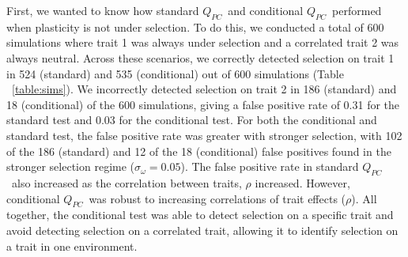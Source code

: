 \documentclass[11pt,letterpaper]{article}
\newcommand{\qpc}{$Q_{PC}$}
\begin{document}

First, we wanted to know how standard \qpc\ and conditional \qpc\ performed when plasticity is not under selection. 
To do this, we conducted a total of 600 simulations where trait 1 was always under selection and a correlated trait 2 was always neutral. 
Across these scenarios, we correctly detected selection on trait 1 in 524 (standard) and 535 (conditional) out of 600 simulations (Table ~\ref{table:sims}). 
We incorrectly detected selection on trait 2 in 186 (standard) and 18 (conditional) of the 600 simulations, giving a false positive rate of 0.31 for the standard test and 0.03 for the conditional test. 
For both the conditional and standard test, the false positive rate was greater with stronger selection, with 102 of the 186 (standard) and 12 of the 18 (conditional) false positives found in the stronger selection regime ($\sigma_\omega = 0.05$). 
The false positive rate in standard \qpc\ also increased as the correlation between traits, $\rho$ increased.
However, conditional \qpc\ was robust to increasing correlations of trait effects ($\rho$). 
All together, the conditional test was able to detect selection on a specific trait and avoid detecting selection on a correlated trait, allowing it to identify selection on a trait in one environment.
\end{document}
